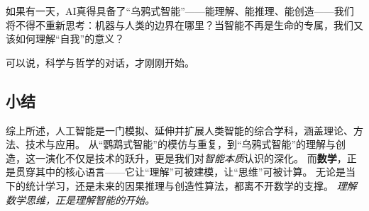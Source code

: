 如果有一天，AI真得具备了“乌鸦式智能”——能理解、能推理、能创造——我们将不得不重新思考：机器与人类的边界在哪里？当智能不再是生命的专属，我们又该如何理解“自我”的意义？

可以说，科学与哲学的对话，才刚刚开始。

\subsection{小结}
综上所述，人工智能是一门模拟、延伸并扩展人类智能的综合学科，涵盖理论、方法、技术与应用。
从“鹦鹉式智能”的模仿与重复，到“乌鸦式智能”的理解与创造，这一演化不仅是技术的跃升，更是我们对\emph{智能本质}认识的深化。
而\textbf{数学}，正是贯穿其中的核心语言——它让“理解”可被建模，让“思维”可被计算。
无论是当下的统计学习，还是未来的因果推理与创造性算法，都离不开数学的支撑。
\emph{理解数学思维，正是理解智能的开始。}

\nocite{*}
\newpage